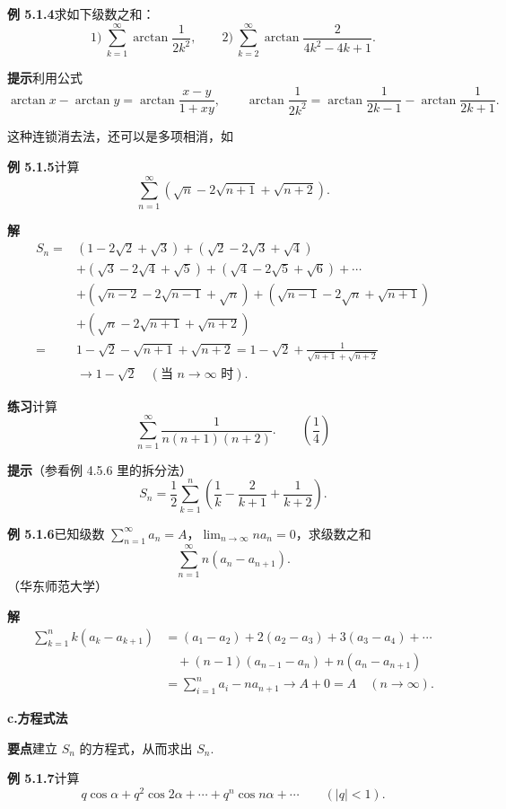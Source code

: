 \documentclass[UTF8,12pt,a4paper,fontset=fandol]{ctexart}
\begin{document}
\noindent\textbf{例 5.1.4}\quad 求如下级数之和：
\[
  1)\ \sum_{k=1}^\infty \arctan\frac1{2k^2},\qquad
  2)\ \sum_{k=2}^\infty \arctan\frac2{4k^2-4k+1}.
\]

\noindent\textbf{提示}\quad 利用公式
\[
  \arctan x-\arctan y=\arctan\frac{x-y}{1+xy},\qquad
  \arctan\frac1{2k^2}=\arctan\frac1{2k-1}-\arctan\frac1{2k+1}.
\]

这种连锁消去法，还可以是多项相消，如

\noindent\textbf{例 5.1.5}\quad 计算
\[
  \sum_{n=1}^\infty\left(\sqrt n-2\sqrt{n+1}+\sqrt{n+2}\right).
\]

\noindent\textbf{解}\quad
\[
\begin{aligned}
S_n={}&(1-2\sqrt2+\sqrt3)+(\sqrt2-2\sqrt3+\sqrt4)\\
&+(\sqrt3-2\sqrt4+\sqrt5)+(\sqrt4-2\sqrt5+\sqrt6)+\cdots\\
&+\left(\sqrt{n-2}-2\sqrt{n-1}+\sqrt n\right)
 +\left(\sqrt{n-1}-2\sqrt n+\sqrt{n+1}\right)\\
&+\left(\sqrt n-2\sqrt{n+1}+\sqrt{n+2}\right)\\
={}&1-\sqrt2-\sqrt{n+1}+\sqrt{n+2}
=1-\sqrt2+\frac1{\sqrt{n+1}+\sqrt{n+2}}\\
&\to 1-\sqrt2\quad(\text{当 }n\to\infty\text{ 时}).
\end{aligned}
\]

\noindent\textbf{练习}\quad 计算
\[
  \sum_{n=1}^\infty \frac1{n(n+1)(n+2)}.\qquad\left(\frac14\right)
\]

\noindent\textbf{提示}\quad （参看例 4.5.6 里的拆分法）
\[
  S_n=\frac12\sum_{k=1}^n\left(\frac1k-\frac2{k+1}+\frac1{k+2}\right).
\]

\noindent\textbf{例 5.1.6}\quad 已知级数 $\displaystyle\sum_{n=1}^\infty a_n=A$，$\displaystyle\lim_{n\to\infty}na_n=0$，求级数之和
\[
  \sum_{n=1}^\infty n(a_n-a_{n+1}).
\]
（华东师范大学）

\noindent\textbf{解}\quad
\[
\begin{aligned}
\sum_{k=1}^n k(a_k-a_{k+1})
&=(a_1-a_2)+2(a_2-a_3)+3(a_3-a_4)+\cdots\\
&\quad+(n-1)(a_{n-1}-a_n)+n(a_n-a_{n+1})\\
&=\sum_{i=1}^n a_i-na_{n+1}\to A+0=A\quad(n\to\infty).
\end{aligned}
\]

\noindent\textbf{c.\quad 方程式法}

\noindent\textbf{要点}\quad 建立 $S_n$ 的方程式，从而求出 $S_n$.

\noindent\textbf{例 5.1.7}\quad 计算
\[
  q\cos\alpha+q^2\cos2\alpha+\cdots+q^n\cos n\alpha+\cdots\qquad(|q|<1).
\]
\end{document}
